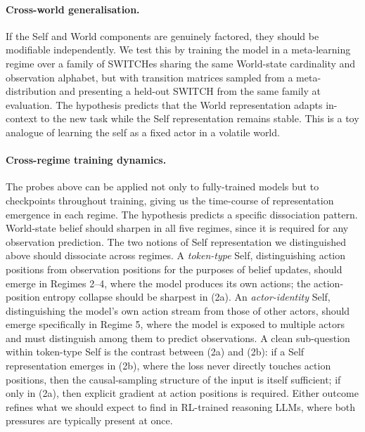 \documentclass[11pt]{article}
\begin{document}
\paragraph{Cross-world generalisation.} If the Self and World components are genuinely factored, they should be modifiable independently. We test this by training the model in a meta-learning regime over a family of SWITCHes sharing the same World-state cardinality and observation alphabet, but with transition matrices sampled from a meta-distribution and presenting a held-out SWITCH from the same family at evaluation. The hypothesis predicts that the World representation adapts in-context to the new task while the Self representation remains stable. This is a toy analogue of learning the self as a fixed actor in a volatile world.

\paragraph{Cross-regime training dynamics.} The probes above can be applied not only to fully-trained models but to checkpoints throughout training, giving us the time-course of representation emergence in each regime. The hypothesis predicts a specific dissociation pattern. World-state belief should sharpen in all five regimes, since it is required for any observation prediction. The two notions of Self representation we distinguished above should dissociate across regimes. A \emph{token-type} Self, distinguishing action positions from observation positions for the purposes of belief updates, should emerge in Regimes 2--4, where the model produces its own actions; the action-position entropy collapse should be sharpest in (2a). An \emph{actor-identity} Self, distinguishing the model's own action stream from those of other actors, should emerge specifically in Regime 5, where the model is exposed to multiple actors and must distinguish among them to predict observations. A clean sub-question within token-type Self is the contrast between (2a) and (2b): if a Self representation emerges in (2b), where the loss never directly touches action positions, then the causal-sampling structure of the input is itself sufficient; if only in (2a), then explicit gradient at action positions is required. Either outcome refines what we should expect to find in RL-trained reasoning LLMs, where both pressures are typically present at once.
\end{document}
